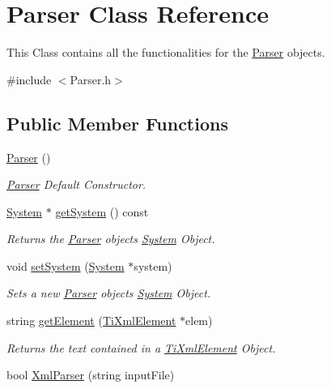 \hypertarget{classParser}{}\section{Parser Class Reference}
\label{classParser}


This Class contains all the functionalities for the \hyperlink{classParser}{Parser} objects.  




{\ttfamily \#include $<$Parser.\+h$>$}

\subsection*{Public Member Functions}
\begin{DoxyCompactItemize}
\item 
\hyperlink{classParser_a12234f6cd36b61af4b50c94a179422c1}{Parser} ()
\begin{DoxyCompactList}\small\item\em \hyperlink{classParser}{Parser} Default Constructor. \end{DoxyCompactList}\item 
\hyperlink{classSystem}{System} $\ast$ \hyperlink{classParser_addad80574e43b744a82807d0f821d414}{get\+System} () const 
\begin{DoxyCompactList}\small\item\em Returns the \hyperlink{classParser}{Parser} object\textquotesingle{}s \hyperlink{classSystem}{System} Object. \end{DoxyCompactList}\item 
void \hyperlink{classParser_a6deb1e00329b1072886bd6d4b9642b5a}{set\+System} (\hyperlink{classSystem}{System} $\ast$system)
\begin{DoxyCompactList}\small\item\em Sets a new \hyperlink{classParser}{Parser} object\textquotesingle{}s \hyperlink{classSystem}{System} Object. \end{DoxyCompactList}\item 
string \hyperlink{classParser_a36b746dbf631544851e0af2d0e7c6982}{get\+Element} (\hyperlink{classTiXmlElement}{Ti\+Xml\+Element} $\ast$elem)
\begin{DoxyCompactList}\small\item\em Returns the text contained in a \hyperlink{classTiXmlElement}{Ti\+Xml\+Element} Object. \end{DoxyCompactList}\item 
bool \hyperlink{classParser_aa8cdba8032e5d5d87b249be597b196c7}{Xml\+Parser} (string input\+File)

\end{DoxyCompactItemize}
